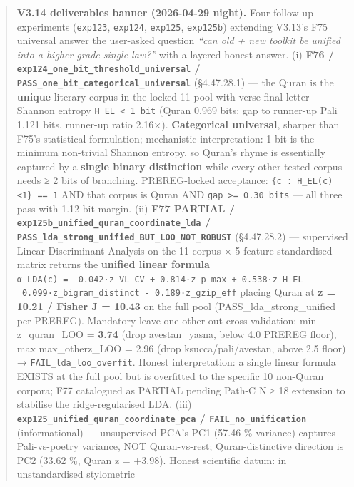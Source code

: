 \documentclass[
]{article}
\begin{document}
\begin{quote}
\textbf{V3.14 deliverables banner (2026-04-29 night).} Four follow-up
experiments (\texttt{exp123}, \texttt{exp124}, \texttt{exp125},
\texttt{exp125b}) extending V3.13's F75 universal answer the user-asked
question \emph{``can old + new toolkit be unified into a higher-grade
single law?''} with a layered honest answer. (i) \textbf{F76 /
\texttt{exp124\_one\_bit\_threshold\_universal} /
\texttt{PASS\_one\_bit\_categorical\_universal}} (§4.47.28.1) --- the
Quran is the \textbf{unique} literary corpus in the locked 11-pool with
verse-final-letter Shannon entropy \texttt{H\_EL\ \textless{}\ 1\ bit}
(Quran 0.969 bits; gap to runner-up Pāli 1.121 bits, runner-up ratio
2.16×). \textbf{Categorical universal}, sharper than F75's statistical
formulation; mechanistic interpretation: 1 bit is the minimum
non-trivial Shannon entropy, so Quran's rhyme is essentially captured by
a \textbf{single binary distinction} while every other tested corpus
needs ≥ 2 bits of branching. PREREG-locked acceptance:
\texttt{\textbar{}\{c\ :\ H\_EL(c)\textless{}1\}\textbar{}\ ==\ 1} AND
that corpus is Quran AND \texttt{gap\ \textgreater{}=\ 0.30\ bits} ---
all three pass with 1.12-bit margin. (ii) \textbf{F77 PARTIAL /
\texttt{exp125b\_unified\_quran\_coordinate\_lda} /
\texttt{PASS\_lda\_strong\_unified\_BUT\_LOO\_NOT\_ROBUST}} (§4.47.28.2)
--- supervised Linear Discriminant Analysis on the 11-corpus × 5-feature
standardised matrix returns the \textbf{unified linear formula}
\texttt{α\_LDA(c)\ =\ -0.042·z\_VL\_CV\ +\ 0.814·z\_p\_max\ +\ 0.538·z\_H\_EL\ -\ 0.099·z\_bigram\_distinct\ -\ 0.189·z\_gzip\_eff}
placing Quran at \textbf{\textbar z\textbar{} = 10.21 / Fisher J =
10.43} on the full pool (PASS\_lda\_strong\_unified per PREREG).
Mandatory leave-one-other-out cross-validation: min
\textbar z\_quran\textbar\_LOO = \textbf{3.74} (drop avestan\_yasna,
below 4.0 PREREG floor), max max\_other\textbar z\textbar\_LOO = 2.96
(drop ksucca/pali/avestan, above 2.5 floor) →
\texttt{FAIL\_lda\_loo\_overfit}. Honest interpretation: a single linear
formula EXISTS at the full pool but is overfitted to the specific 10
non-Quran corpora; F77 catalogued as PARTIAL pending Path-C N ≥ 18
extension to stabilise the ridge-regularised LDA. (iii)
\textbf{\texttt{exp125\_unified\_quran\_coordinate\_pca} /
\texttt{FAIL\_no\_unification}} (informational) --- unsupervised PCA's
PC1 (57.46 \% variance) captures Pāli-vs-poetry variance, NOT
Quran-vs-rest; Quran-distinctive direction is PC2 (33.62 \%, Quran z =
+3.98). Honest scientific datum: in unstandardised stylometric

\end{quote}
\end{document}
